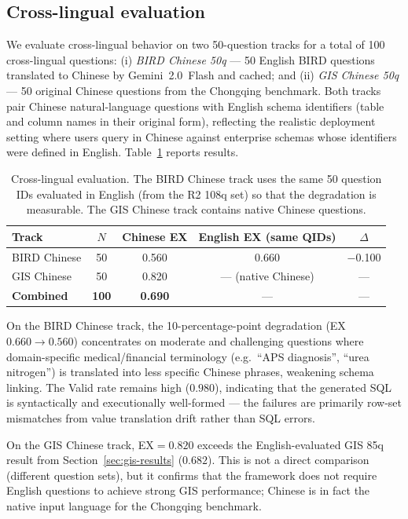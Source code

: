 \documentclass[11pt]{article}
\begin{document}
\subsection{Cross-lingual evaluation}
\label{sec:cross-lingual}

We evaluate cross-lingual behavior on two 50-question tracks for a total of 100 cross-lingual questions: (i) \emph{BIRD Chinese 50q} --- 50 English BIRD questions translated to Chinese by Gemini~2.0~Flash and cached; and (ii) \emph{GIS Chinese 50q} --- 50 original Chinese questions from the Chongqing benchmark. Both tracks pair Chinese natural-language questions with English schema identifiers (table and column names in their original form), reflecting the realistic deployment setting where users query in Chinese against enterprise schemas whose identifiers were defined in English. Table~\ref{tab:crosslingual} reports results.

\begin{table}[t]
\centering
\caption{Cross-lingual evaluation. The BIRD Chinese track uses the same 50 question IDs evaluated in English (from the R2 108q set) so that the degradation is measurable. The GIS Chinese track contains native Chinese questions.}
\label{tab:crosslingual}
\begin{tabular}{lcccc}
\toprule
Track & $N$ & Chinese EX & English EX (same QIDs) & $\Delta$ \\
\midrule
BIRD Chinese  & 50  & 0.560 & 0.660 & $-$0.100 \\
GIS Chinese   & 50  & 0.820 & --- (native Chinese)    & --- \\
\midrule
\textbf{Combined} & \textbf{100} & \textbf{0.690} & --- & --- \\
\bottomrule
\end{tabular}
\end{table}

On the BIRD Chinese track, the 10-percentage-point degradation (EX $0.660 \to 0.560$) concentrates on moderate and challenging questions where domain-specific medical/financial terminology (e.g.\ ``APS diagnosis'', ``urea nitrogen'') is translated into less specific Chinese phrases, weakening schema linking. The Valid rate remains high ($0.980$), indicating that the generated SQL is syntactically and executionally well-formed --- the failures are primarily row-set mismatches from value translation drift rather than SQL errors.

On the GIS Chinese track, EX$=0.820$ exceeds the English-evaluated GIS 85q result from Section~\ref{sec:gis-results} ($0.682$). This is not a direct comparison (different question sets), but it confirms that the framework does not require English questions to achieve strong GIS performance; Chinese is in fact the native input language for the Chongqing benchmark.
\end{document}
